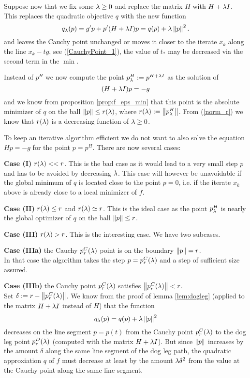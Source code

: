 Suppose now that we fix some $\lambda\geq 0$ and replace the matrix $H$ with 
$H+\lambda I$. This replaces the quadratic objective $q$ with the new function
%
\begin{equation}
\label{f_lambda}
q_\lambda(p)=g'p+p'(H+\lambda I)p = q(p)+\lambda\left\|p\right\|^2.
\end{equation}  
%
and leaves the Cauchy point unchanged or moves it closer to the iterate $x_k$
along the line $x_k-tg$, see (\ref{CauchyPoint_1}), the value of $t_*$ may be 
decreased via the second term in the $\min$.

Instead of $p^H$ we now compute the point $p^H_\lambda:=p^{H+\lambda I}$ as the solution
of
%
\begin{equation}
\label{H_lambda}
(H+\lambda I)p=-g
\end{equation}  
%
and we know from proposition \ref{prop:f_eps_min} that this point is the absolute
minimizer of $q$ on the ball $\left\|p\right\|\leq r(\lambda)$, where
$r(\lambda):=\left\|p^H_\lambda\right\|$. From (\ref{norm_r}) we know that $r(\lambda)$ is a decreasing
function of $\lambda\geq 0$. 

To keep an iterative algorithm efficient we do not want to also solve the 
equation $Hp=-g$ for the point $p=p^H$. There are now several cases:

\medskip\noindent
\textbf{Case (I)} $r(\lambda)<<r$. This is the bad case as it would lead to a very 
small step $p$ and has to be avoided by decreasing $\lambda$. This case will however 
be unavoidable if the global minimum of $q$ is located close to the point $p=0$,
i.e. if the iterate $x_k$ above is already close to a local minimizer of $f$.

\medskip\noindent
\textbf{Case (II)} $r(\lambda)\leq r$ and $r(\lambda)\simeq r$. This is the ideal case
as the point $p^H_\lambda$ is nearly the global optimizer of $q$ on the ball
$\left\|p\right\|\leq r$. 

\medskip\noindent
\textbf{Case (III)} $r(\lambda)>r$. This is the interesting case. We have two 
subcases.

\medskip\noindent
\textbf{Case (IIIa)} the Cauchy $p^C_r(\lambda)$ point is on the boundary $\left\|p\right\|=r$.\\ 
In that case the algorithm takes the step $p=p^C_r(\lambda)$ and a step of sufficient size 
assured.  

\medskip\noindent
\textbf{Case (IIIb)} the Cauchy point $p^C_r(\lambda)$ satisfies $\left\|p^C_r(\lambda)\right\|<r$.\\
Set $\delta:=r-\left\|p^C_r(\lambda)\right\|$. We know from the proof of lemma \ref{lem:dogleg}
(applied to the matrix $H+\lambda I$ instead of $H$) that the function
$$
q_\lambda(p)=q(p)+\lambda\left\|p\right\|^2
$$
decreases on the line segment $p=p(t)$ from the Cauchy point $p^C_r(\lambda)$ to the
dog leg point $p^D_r(\lambda)$ (computed with the matrix $H+\lambda I$). But since
$\left\|p\right\|$ increases by the amount $\delta$ along the same line segment of the
dog leg path, the quadratic approxiation $q$ of $f$ must decrease at least by
the amount $\lambda\delta^2$ from the value at the Cauchy point along the same line
segment. 

